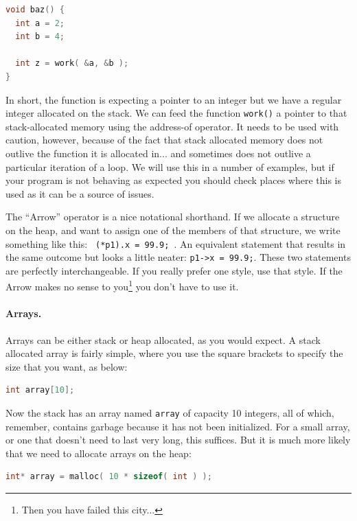 \documentclass[a4paper]{report}
\begin{document}
\begin{lstlisting}[language=C]
void baz() {
  int a = 2;
  int b = 4;

  int z = work( &a, &b );
}
\end{lstlisting}

In short, the function is expecting a pointer to an integer but we have a regular integer allocated on the stack. We can feed the function \texttt{work()} a pointer to that stack-allocated memory using the address-of operator. It needs to be used with caution, however, because of the fact that stack allocated memory does not outlive the function it is allocated in... and sometimes does not outlive a particular iteration of a loop. We will use this in a number of examples, but if your program is not behaving as expected you should check places where this is used as it can be a source of issues.

The ``Arrow'' operator is a nice notational shorthand. If we allocate a structure on the heap, and want to assign one of the members of that structure, we write something like this: \texttt{ (*p1).x = 99.9; }. An equivalent statement that results in the same outcome but looks a little neater: \texttt{p1->x = 99.9;}. These two statements are perfectly interchangeable. If you really prefer one style, use that style. If the Arrow makes no sense to you\footnote{Then you have failed this city...} you don't have to use it.

\paragraph{Arrays.}

Arrays can be either stack or heap allocated, as you would expect. A stack allocated array is fairly simple, where you use the square brackets to specify the size that you want, as below:

\begin{lstlisting}[language=C]
int array[10];
\end{lstlisting}

Now the stack has an array named \texttt{array} of capacity 10 integers, all of which, remember, contains garbage because it has not been initialized. For a small array, or one that doesn't need to last very long, this suffices. But it is much more likely that we need to allocate arrays on the heap:

\begin{lstlisting}[language=C]
int* array = malloc( 10 * sizeof( int ) );
\end{lstlisting}
\end{document}
